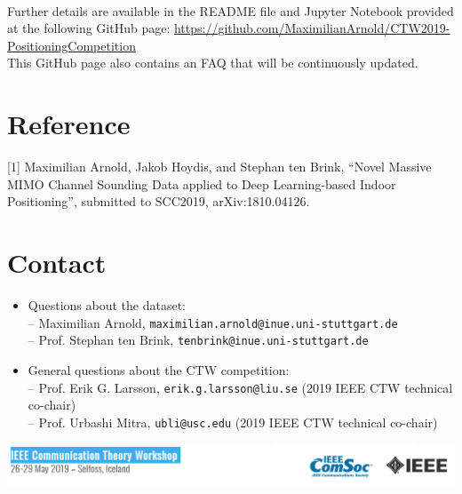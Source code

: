 \documentclass[letter]{moderncv} %
\begin{document}
~

Further details are available in  the   README file and   Jupyter Notebook provided at the following GitHub page:\newline
\url{https://github.com/MaximilianArnold/CTW2019-PositioningCompetition} \\
This GitHub page also contains an FAQ that will be continuously updated.

 
\pagestyle{empty}


\section{Reference}%
[1] Maximilian Arnold, Jakob Hoydis, and Stephan ten Brink,  ``Novel Massive MIMO Channel Sounding Data applied to Deep Learning-based Indoor Positioning'', submitted to SCC2019, arXiv:1810.04126.

\section{Contact}

\begin{itemize}
\item Questions about the dataset: \\
-- Maximilian Arnold, \texttt{maximilian.arnold@inue.uni-stuttgart.de} \\
-- Prof. Stephan ten Brink, \texttt{tenbrink@inue.uni-stuttgart.de} \\

\item General questions about the CTW competition: \\
-- Prof. Erik G. Larsson, \texttt{erik.g.larsson@liu.se} (2019 IEEE CTW technical co-chair) \\
-- Prof. Urbashi Mitra, \texttt{ubli@usc.edu} (2019 IEEE CTW technical co-chair) 

\end{itemize}

\vfill

\includegraphics[width=1\textwidth]{Comsoc}
\end{document}
